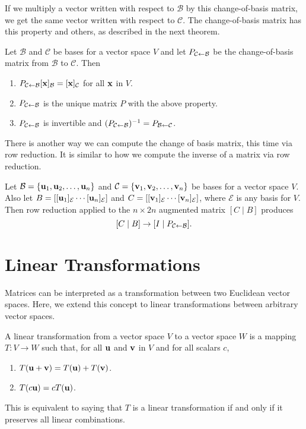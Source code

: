 \documentclass[../m73main.tex]{subfiles}
\begin{document}
If we multiply a vector written with respect to $\mathcal{B}$ by this change-of-basis matrix, we get the same vector written with respect to $\mathcal{C}$.
The change-of-basis matrix has this property and others, as described in the next theorem.

\begin{theorem}
	Let $\mathcal{B}$ and $\mathcal{C}$ be bases for a vector space $V$ and let $P_{\mathcal{C} \leftarrow \mathcal{B}}$ be the change-of-basis matrix from $\mathcal{B}$ to $\mathcal{C}$.
	Then
	\begin{enumerate}[label=(\alph*)]
		\item $P_{\mathcal{C} \leftarrow \mathcal{B}}[\mathbf{x}]_{\mathcal{B}} = [\mathbf{x}]_{\mathcal{C}}$ for all $\mathbf{x}$ in $V$.
		\item $P_{\mathcal{C} \leftarrow \mathcal{B}}$ is the unique matrix $P$ with the above property.
		\item $P_{\mathcal{C} \leftarrow \mathcal{B}}$ is invertible and $(P_{\mathcal{C} \leftarrow \mathcal{B}})^{-1} = P_{\mathcal{B} \leftarrow \mathcal{C}}$.
	\end{enumerate}
\end{theorem}

There is another way we can compute the change of basis matrix, this time via row reduction.
It is similar to how we compute the inverse of a matrix via row reduction.

\begin{theorem}
	Let $\mathcal{B} = \{\mathbf{u}_1, \mathbf{u}_2, \ldots, \mathbf{u}_n\}$ and $\mathcal{C} = \{\mathbf{v}_1, \mathbf{v}_2, \ldots, \mathbf{v}_n\}$ be bases for a vector space $V$.
	Also let $B = [[\mathbf{u}_1]_{\mathcal{E}} \cdots [\mathbf{u}_n]_{\mathcal{E}}]$ and $C = [[\mathbf{v}_1]_{\mathcal{E}} \cdots [\mathbf{v}_n]_{\mathcal{E}}]$, where $\mathcal{E}$ is any basis for $V$.
	Then row reduction applied to the $n \times 2n$ augmented matrix $[C \;|\; B]$ produces
	\[ [C \;|\; B] \to [I \;|\; P_{\mathcal{C} \leftarrow \mathcal{B}}]. \]
\end{theorem}

\section{Linear Transformations}
Matrices can be interpreted as a transformation between two Euclidean vector spaces.
Here, we extend this concept to linear transformations between arbitrary vector spaces.

\begin{definition}
	A linear transformation from a vector space $V$ to a vector space $W$ is a mapping $T : V \to W$ such that, for all $\mathbf{u}$ and $\mathbf{v}$ in $V$ and for all scalars $c$,
	\begin{enumerate}
		\item $T(\mathbf{u} + \mathbf{v}) = T(\mathbf{u}) + T(\mathbf{v})$.
		\item $T(c \mathbf{u}) = cT(\mathbf{u})$.
	\end{enumerate}
	This is equivalent to saying that $T$ is a linear transformation if and only if it preserves all linear combinations.
\end{definition}
\end{document}
